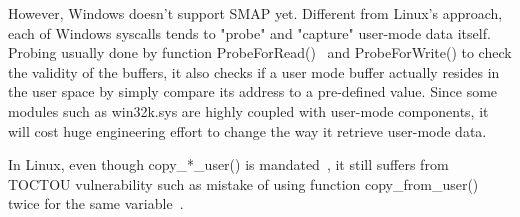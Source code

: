 However, Windows doesn't support SMAP yet. Different from Linux's approach, each of Windows syscalls tends to "probe" and "capture" user-mode data itself. Probing usually done by function ProbeForRead()~\cite{probeforread} and ProbeForWrite() to check the validity of the buffers, it also checks if a user mode buffer actually resides in the user space by simply compare its address to a pre-defined value. Since some modules such as win32k.sys are highly coupled with user-mode components, it will cost huge engineering effort to change the way it retrieve user-mode data.

In Linux, even though copy\_*\_user() is mandated~\cite{corbet2012linuxsmap}, it still suffers from TOCTOU vulnerability such as mistake of using function copy\_from\_user() twice for the same variable~\cite{double-fetch-linux}. 
